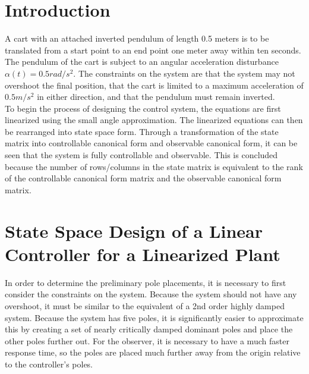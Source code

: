 \documentclass[12pt]{article}
\begin{document}
%

\newpage


\section{Introduction}
A cart with an attached inverted pendulum of length 0.5 meters is to be translated from a start point to an end point one meter away within ten seconds.    The pendulum of the cart is subject to an angular acceleration disturbance $\alpha(t)=0.5 rad/s^2$.  The constraints on the system are that the system may not overshoot the final position, that the cart is limited to a maximum acceleration of $0.5m/s^2$ in either direction, and that the pendulum must remain inverted.\\
To begin the process of designing the control system, the equations are first linearized using the small angle approximation.  The linearized equations can then be rearranged into state space form.  Through a transformation of the state matrix into controllable canonical form and observable canonical form, it can be seen that the system is fully controllable and observable.  This is concluded because the number of rows/columns in the state matrix is equivalent to the rank of the controllable canonical form matrix and the observable canonical form matrix.

\section{State Space Design of a Linear Controller for a Linearized Plant}
In order to determine the preliminary pole placements, it is necessary to first consider the constraints on the system.  Because the system should not have any overshoot, it must be similar to the equivalent of a 2nd order highly damped system.  Because the system has five poles, it is significantly easier to approximate this by creating a set of nearly critically damped dominant poles and place the other poles further out.  For the observer, it is necessary to have a much faster response time, so the poles are placed much further away from the origin relative to the controller's poles.
\end{document}
